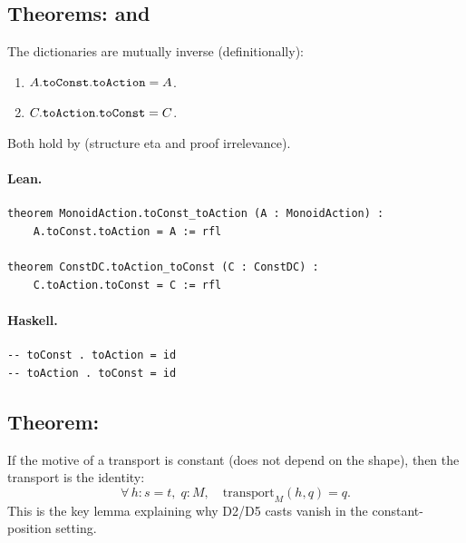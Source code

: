 \documentclass[11pt,a4paper]{article}
\begin{document}
\subsection{Theorems:  and }

\begin{thm}
The dictionaries are mutually inverse (definitionally):
\begin{enumerate}
  \item $A.\texttt{toConst}.\texttt{toAction} = A$.
  \item $C.\texttt{toAction}.\texttt{toConst} = C$.
\end{enumerate}
Both hold by  (structure eta and proof irrelevance).
\end{thm}

\paragraph{Lean.}
\begin{lstlisting}[style=lean]
theorem MonoidAction.toConst_toAction (A : MonoidAction) :
    A.toConst.toAction = A := rfl

theorem ConstDC.toAction_toConst (C : ConstDC) :
    C.toAction.toConst = C := rfl
\end{lstlisting}

\paragraph{Haskell.}
\begin{lstlisting}[style=haskell]
-- toConst . toAction = id
-- toAction . toConst = id
\end{lstlisting}


\subsection{Theorem: }

\begin{thm}
If the motive of a transport is constant (does not depend on the shape),
then the transport is the identity:
\[
  \forall\, h : s = t,\; q : M,\quad \mathrm{transport}_{M}(h, q) = q.
\]
This is the key lemma explaining why D2/D5 casts vanish in the constant-
position setting.
\end{thm}
\end{document}
